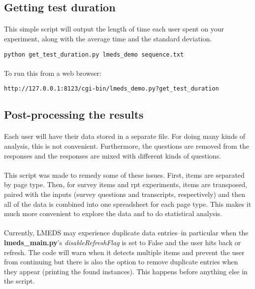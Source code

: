\subsection{Getting test duration}

\paragraph{}
This simple script will output the length of time each user spent on your experiment, along with the average time and the standard deviation.

\begin{lstlisting}
python get_test_duration.py lmeds_demo sequence.txt
\end{lstlisting}

\paragraph{}
To run this from a web browser:
\begin{lstlisting}
http://127.0.0.1:8123/cgi-bin/lmeds_demo.py?get_test_duration
\end{lstlisting}



\subsection{Post-processing the results}

\paragraph{}
Each user will have their data stored in a separate file.  For doing many kinds of analysis, this is not convenient.  Furthermore, the questions are removed from the responses and the responses are mixed with different kinds of questions.

\paragraph{}
This script was made to remedy some of these issues.  First, items are separated by page type.  Then, for survey items and rpt experiments, items are transposed, paired with the inputs (survey questions and transcripts, respectively) and then all of the data is combined into one spreadsheet for each page type.  This makes it much more convenient to explore the data and to do statistical analysis.

\paragraph{}
Currently, LMEDS may experience duplicate data entries--in particular when the \textbf{lmeds\_main.py}'s \textit{disableRefreshFlag} is set to False and the user hits back or refresh.  The code will warn when it detects multiple items and prevent the user from continuing but there is also the option to remove duplicate entries when they appear (printing the found instances).  This happens before anything else in the script.


